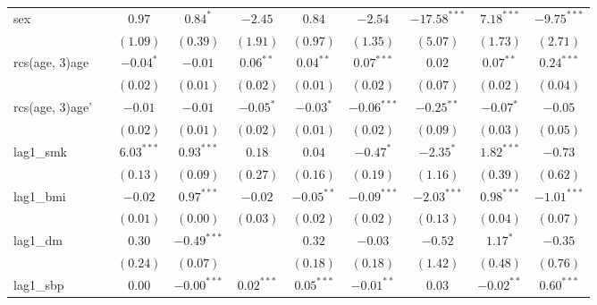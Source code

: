 \begin{tabular}{l c c c c c c c c c}
sex                 &              & $0.97$       & $0.84^{*}$    & $-2.45$        & $0.84$         & $-2.54$        & $-17.58^{***}$ & $7.18^{***}$  & $-9.75^{***}$ \\
                    &              & $(1.09)$     & $(0.39)$      & $(1.91)$       & $(0.97)$       & $(1.35)$       & $(5.07)$       & $(1.73)$      & $(2.71)$      \\
rcs(age, 3)age      &              & $-0.04^{*}$  & $-0.01$       & $0.06^{**}$    & $0.04^{**}$    & $0.07^{***}$   & $0.02$         & $0.07^{**}$   & $0.24^{***}$  \\
                    &              & $(0.02)$     & $(0.01)$      & $(0.02)$       & $(0.01)$       & $(0.02)$       & $(0.07)$       & $(0.02)$      & $(0.04)$      \\
rcs(age, 3)age'     &              & $-0.01$      & $-0.01$       & $-0.05^{*}$    & $-0.03^{*}$    & $-0.06^{***}$  & $-0.25^{**}$   & $-0.07^{*}$   & $-0.05$       \\
                    &              & $(0.02)$     & $(0.01)$      & $(0.02)$       & $(0.01)$       & $(0.02)$       & $(0.09)$       & $(0.03)$      & $(0.05)$      \\
lag1\_smk           &              & $6.03^{***}$ & $0.93^{***}$  & $0.18$         & $0.04$         & $-0.47^{*}$    & $-2.35^{*}$    & $1.82^{***}$  & $-0.73$       \\
                    &              & $(0.13)$     & $(0.09)$      & $(0.27)$       & $(0.16)$       & $(0.19)$       & $(1.16)$       & $(0.39)$      & $(0.62)$      \\
lag1\_bmi           &              & $-0.02$      & $0.97^{***}$  & $-0.02$        & $-0.05^{**}$   & $-0.09^{***}$  & $-2.03^{***}$  & $0.98^{***}$  & $-1.01^{***}$ \\
                    &              & $(0.01)$     & $(0.00)$      & $(0.03)$       & $(0.02)$       & $(0.02)$       & $(0.13)$       & $(0.04)$      & $(0.07)$      \\
lag1\_dm            &              & $0.30$       & $-0.49^{***}$ &                & $0.32$         & $-0.03$        & $-0.52$        & $1.17^{*}$    & $-0.35$       \\
                    &              & $(0.24)$     & $(0.07)$      &                & $(0.18)$       & $(0.18)$       & $(1.42)$       & $(0.48)$      & $(0.76)$      \\
lag1\_sbp           &              & $0.00$       & $-0.00^{***}$ & $0.02^{***}$   & $0.05^{***}$   & $-0.01^{**}$   & $0.03$         & $-0.02^{**}$  & $0.60^{***}$  \\

\end{tabular}
